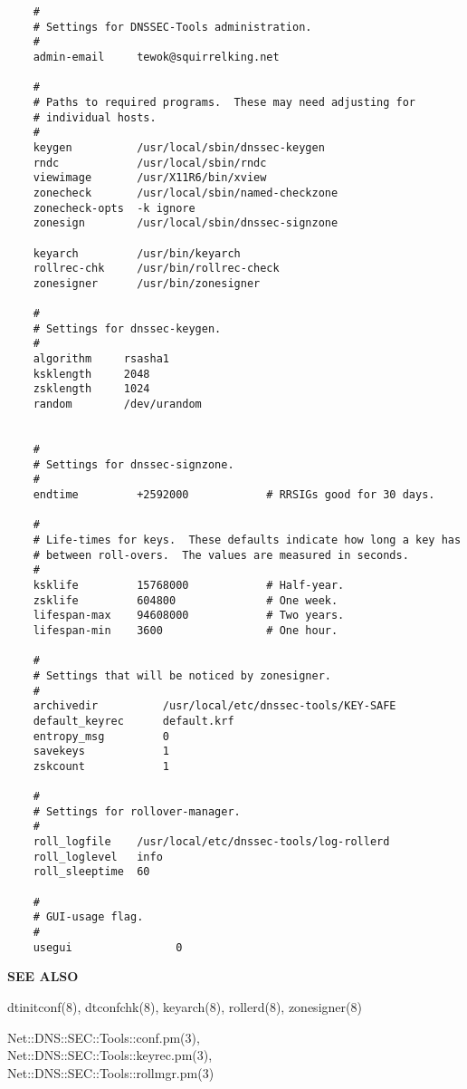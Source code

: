 \begin{verbatim}
    #
    # Settings for DNSSEC-Tools administration.
    #
    admin-email     tewok@squirrelking.net

    #
    # Paths to required programs.  These may need adjusting for
    # individual hosts.
    #
    keygen          /usr/local/sbin/dnssec-keygen
    rndc            /usr/local/sbin/rndc
    viewimage       /usr/X11R6/bin/xview
    zonecheck       /usr/local/sbin/named-checkzone
    zonecheck-opts  -k ignore
    zonesign        /usr/local/sbin/dnssec-signzone

    keyarch         /usr/bin/keyarch
    rollrec-chk     /usr/bin/rollrec-check
    zonesigner      /usr/bin/zonesigner

    #
    # Settings for dnssec-keygen.
    #
    algorithm     rsasha1
    ksklength     2048
    zsklength     1024
    random        /dev/urandom
    
    
    #
    # Settings for dnssec-signzone.
    #
    endtime         +2592000            # RRSIGs good for 30 days.

    #
    # Life-times for keys.  These defaults indicate how long a key has
    # between roll-overs.  The values are measured in seconds.
    # 
    ksklife         15768000            # Half-year.
    zsklife         604800              # One week.
    lifespan-max    94608000            # Two years.
    lifespan-min    3600                # One hour.

    #
    # Settings that will be noticed by zonesigner.
    #
    archivedir          /usr/local/etc/dnssec-tools/KEY-SAFE
    default_keyrec      default.krf
    entropy_msg         0
    savekeys            1
    zskcount            1

    #
    # Settings for rollover-manager.
    #
    roll_logfile    /usr/local/etc/dnssec-tools/log-rollerd
    roll_loglevel   info
    roll_sleeptime  60

    #
    # GUI-usage flag.
    #
    usegui                0
\end{verbatim}

{\bf SEE ALSO}

dtinitconf(8),
dtconfchk(8),
keyarch(8),
rollerd(8),
zonesigner(8)

Net::DNS::SEC::Tools::conf.pm(3),\\
Net::DNS::SEC::Tools::keyrec.pm(3),\\
Net::DNS::SEC::Tools::rollmgr.pm(3)

